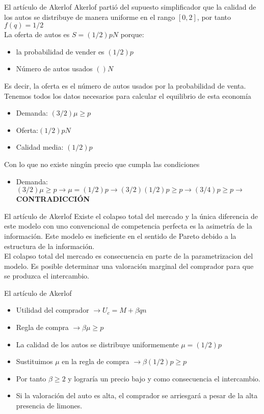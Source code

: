 \begin{frame}{El artículo de Akerlof}
	Akerlof partió del supuesto simplificador que la calidad de los autos se distribuye de manera uniforme en el rango $[0,2]$, por tanto $f(q)= 1/2$\\[0.3cm]
	
	La oferta de autos es $S=(1/2)pN$ porque:
		\begin{itemize}
			\item la probabilidad de vender es $(1/2)p$
			\item Número de autos usados $()N$
		\end{itemize}
	Es decir, la oferta es el número de autos usados por la probabilidad de venta. Tenemos todos los datos necesarios para calcular el equilibrio de esta economía
		\begin{itemize}
			\item Demanda: $(3/2) \mu \geq p$
			\item Oferta:$(1/2)pN$
			\item Calidad media: $(1/2)p$
		\end{itemize}
	Con lo que no existe ningún precio que cumpla las condiciones
		\begin{itemize}
			\item Demanda: $(3/2) \mu \geq p \rightarrow \mu=(1/2)p \rightarrow (3/2)(1/2)p\geq p \rightarrow (3/4)p\geq p \rightarrow $ \textbf{CONTRADICCIÓN}
		\end{itemize}
\end{frame}
\begin{frame}{El artículo de Akerlof}
Existe el colapso total del mercado y la única diferencia de este modelo con uno convencional de competencia perfecta es la asimetría de la información. Este modelo es ineficiente en el sentido de Pareto debido a la estructura de la información.\\[0.3cm]
El colapso total del mercado es consecuencia en parte de la parametrizacion del modelo. Es posible determinar una valoración marginal del comprador para que se produzca el intercambio.
\end{frame}
\begin{frame}{El artículo de Akerlof}
	\begin{itemize}
		\item Utilidad del comprador $\longrightarrow U_c = M+\beta qn$
		\item Regla de compra $\longrightarrow \beta \mu \geq p$
		\item La calidad de los autos se distribuye uniformemente $\mu = (1/2)p$
		\item Sustituimos $\mu$ en la regla de compra $\longrightarrow \beta(1/2)p \geq p$
		\item Por tanto $\beta \geq 2$ y lograría un precio bajo y como consecuencia el intercambio.
		\item Si la valoración del auto es alta, el comprador se arriesgará a pesar de la alta presencia de limones.
	\end{itemize}
\end{frame}
